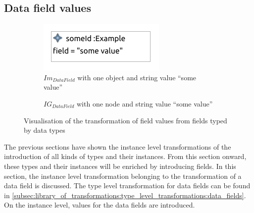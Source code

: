 \subsection{Data field values}
\label{subsec:library_of_transformations:instance_level_transformations:data_field_values}

\begin{figure}
    \centering
    \begin{subfigure}{0.45\textwidth}
        \centering
        \includegraphics{images/05_library_of_transformations/03_instance_level_transformations/06_data_field_values/data_field_value.pdf}
        \caption{$Im_{DataField}$ with one object and string value ``some value''}
        \label{fig:library_of_transformations:instance_level_transformations:data_field_values:visualisation:ecore}
    \end{subfigure}
    \begin{subfigure}{0.45\textwidth}
        \centering
        
        \caption{$IG_{DataField}$ with one node and string value ``some value''}
        \label{fig:library_of_transformations:instance_level_transformations:data_field_values:visualisation:groove}
    \end{subfigure}
    \caption{Visualisation of the transformation of field values from fields typed by data types}
    \label{fig:library_of_transformations:instance_level_transformations:data_field_values:visualisation}
\end{figure}

The previous sections have shown the instance level transformations of the introduction of all kinds of types and their instances. From this section onward, these types and their instances will be enriched by introducing fields. In this section, the instance level transformation belonging to the transformation of a data field is discussed. The type level transformation for data fields can be found in \cref{subsec:library_of_transformations:type_level_transformations:data_fields}. On the instance level, values for the data fields are introduced.

